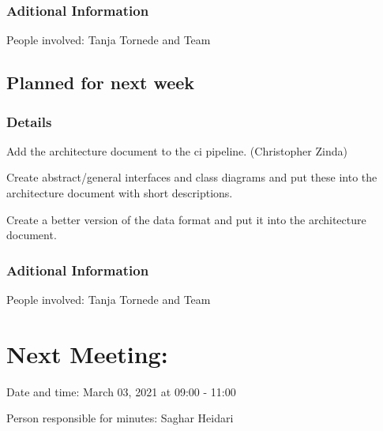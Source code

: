 \documentclass[11pt]{meetingmins} %
\begin{document}
	\subsubsection{Aditional Information}
		\begin{hiddensubitems}
			\item People involved: Tanja Tornede and Team
		\end{hiddensubitems}
\subsection{Planned for next week}
    \subsubsection{Details}
        \begin{hiddensubitems}
            \item Add the architecture document to the ci pipeline. (Christopher Zinda)
            \item Create abstract/general interfaces and class diagrams and put these into the architecture document with short descriptions.
            \item Create a better version of the data format and put it into the architecture document.
        \end{hiddensubitems}
    \subsubsection{Aditional Information}
    	\begin{hiddensubitems}
  		 	\item People involved: Tanja Tornede and Team
  		\end{hiddensubitems}    
    
\section{Next Meeting:}
    \begin{hiddensubitems}
        \item
            Date and time: March 03, 2021 at 09:00 - 11:00
        \item
            Person responsible for minutes: Saghar Heidari
    \end{hiddensubitems}
\end{document}

